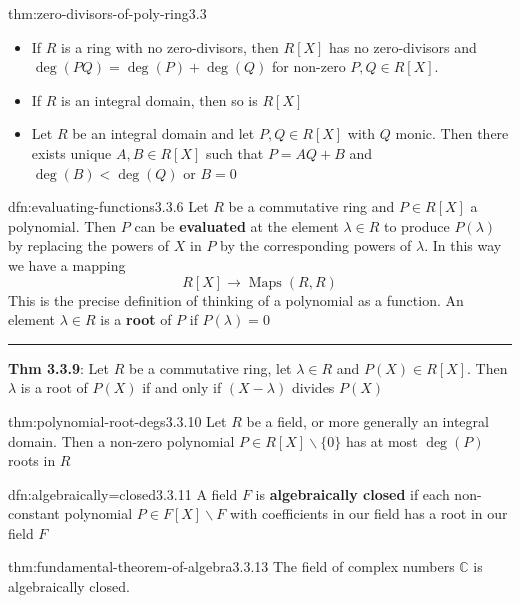 \documentclass[landscape, 8pt]{extarticle}
\DeclareMathOperator{\Maps}{Maps}
\begin{document}
\begin{multicols}{3}
\begin{thm}{thm:zero-divisors-of-poly-ring}{3.3}
    \begin{itemize}
        \setlength\itemsep{0em}
        \item[\textbf{3.3.3}:] If $R$ is a ring with no zero-divisors, then $R[X]$ has no zero-divisors and $\deg(PQ) = \deg(P) + \deg(Q)$ for non-zero $P,Q\in R[X]$.
        \item If $R$ is an integral domain, then so is $R[X]$
        \item[\textbf{3.3.4}:] Let $R$ be an integral domain and let $P, Q\in R[X]$ with $Q$ monic. Then there exists unique $A,B\in R[X]$ such that $P = AQ + B$ and $\deg(B) < \deg(Q)$ or $B = 0$
    \end{itemize}
\end{thm}

\begin{dfn}{dfn:evaluating-functions}{3.3.6}
    Let $R$ be a commutative ring and $P\in R[X]$ a polynomial. Then $P$ can be \textbf{evaluated} at the element $\lambda\in R$ to produce $P(\lambda)$ by replacing the powers of $X$ in $P$ by the corresponding powers of $\lambda$. In this way we have a mapping
    \[R[X] \to \Maps(R, R)\]
    This is the precise definition of thinking of a polynomial as a function. An element $\lambda\in R$ is a \textbf{root} of $P$ if $P(\lambda) = 0$

    \noindent\rule{\textwidth}{0.2pt}
    \textbf{Thm 3.3.9}: Let $R$ be a commutative ring, let $\lambda\in R$ and $P(X)\in R[X]$. Then $\lambda$ is a root of $P(X)$ if and only if $(X - \lambda)$ divides $P(X)$
\end{dfn}

\begin{thm}{thm:polynomial-root-degs}{3.3.10}
    Let $R$ be a field, or more generally an integral domain. Then a non-zero polynomial $P\in R[X] \backslash \{0\}$ has at most $\deg(P)$ roots in $R$
\end{thm}

\begin{dfn}{dfn:algebraically=closed}{3.3.11}
    A field $F$ is \textbf{algebraically closed} if each non-constant polynomial $P\in F[X]\backslash F$ with coefficients in our field has a root in our field $F$
\end{dfn}

\begin{thm}{thm:fundamental-theorem-of-algebra}{3.3.13}
    The field of complex numbers $\mathbb{C}$ is algebraically closed.
\end{thm}


\end{multicols}
\end{document}
